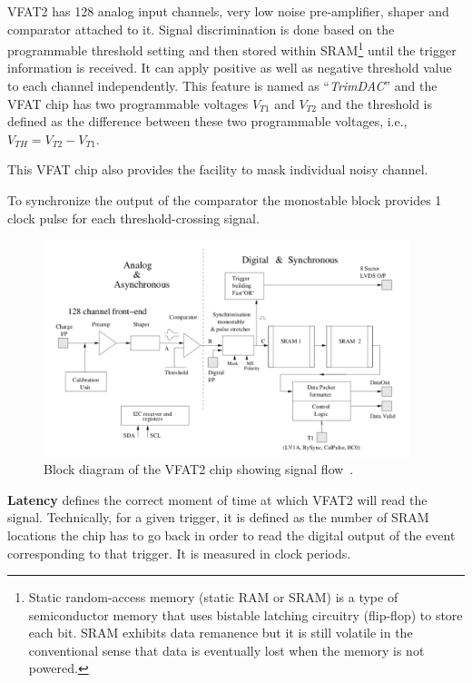 VFAT2 has 128 analog input channels, very low noise pre-amplifier, shaper and comparator attached to it. 
Signal discrimination is done based on the programmable threshold setting and then stored within SRAM\footnote{Static random-access memory (static RAM or SRAM) is a type of semiconductor memory that uses bistable latching circuitry (flip-flop) to store each bit. SRAM exhibits data remanence but it is still volatile in the conventional sense that data is eventually lost when the memory is not powered.} until the trigger information is received. 
It can apply positive as well as negative threshold value to each channel independently. 
This feature is named as ``\textit{TrimDAC}'' and the VFAT chip has two programmable voltages $V_{T1}$ and $V_{T2}$ and the threshold is defined as the difference between these two programmable voltages, i.e., $V_{TH} = V_{T2} - V_{T1}$.

This VFAT chip also provides the facility to mask individual noisy channel.

To synchronize the output of the comparator the monostable block provides 1 clock pulse for each threshold-crossing signal.

\begin{figure}[htbp]
    \centering
    \includegraphics[width=0.95\textwidth]{figures/GEM/VFAT2_chip_BlockDiagram.png}
    \caption{Block diagram of the VFAT2 chip showing signal flow~\cite{Aspell2007}.}
    \label{fig:VFAT2block}
\end{figure}



\textbf{Latency} defines the correct moment of time at which VFAT2 will read the signal. Technically, for a given trigger, it is defined as the number of SRAM locations the chip has to go back in order to read the digital output of the event corresponding to that trigger. It is measured in clock periods. 

